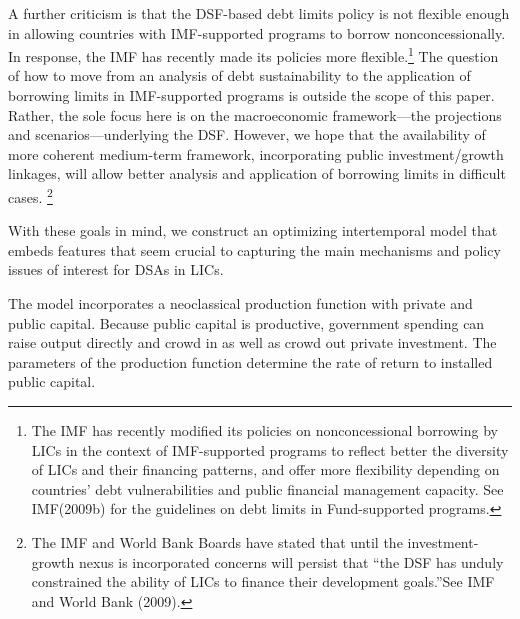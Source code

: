 \documentclass[11pt]{article}
\begin{document}
A further criticism is that the DSF-based debt limits policy is not flexible
enough in allowing countries with IMF-supported programs to borrow
nonconcessionally. In response, the IMF has recently made its policies more
flexible.\footnote{%
The IMF has recently modified its policies on nonconcessional borrowing by
LICs in the context of IMF-supported programs to reflect better the
diversity of LICs and their financing patterns, and offer more flexibility
depending on countries' debt vulnerabilities and public financial management
capacity. See IMF(2009b) for the guidelines on debt limits in Fund-supported
programs.} The question of how to move from an analysis of debt
sustainability to the application of borrowing limits in IMF-supported
programs is outside the scope of this paper. Rather, the sole focus here is
on the macroeconomic framework---the projections and scenarios---underlying
the DSF. However, we hope that the availability of more coherent medium-term
framework, incorporating public investment/growth linkages, will allow
better analysis and application of borrowing limits in difficult cases.%
\footnote{%
The IMF and World Bank Boards have stated that until the investment-growth
nexus is incorporated concerns will persist that \textquotedblleft the DSF
has unduly constrained the ability of LICs to finance their development
goals.\textquotedblright See IMF and World Bank (2009).}

With these goals in mind, we construct an optimizing intertemporal model
that embeds features that seem crucial to capturing the main mechanisms and
policy issues of interest for DSAs in LICs.

The model incorporates a neoclassical production function with private and
public capital. Because public capital is productive, government spending
can raise output directly and crowd in as well as crowd out private
investment. The parameters of the production function determine the rate of
return to installed public capital.
\end{document}
